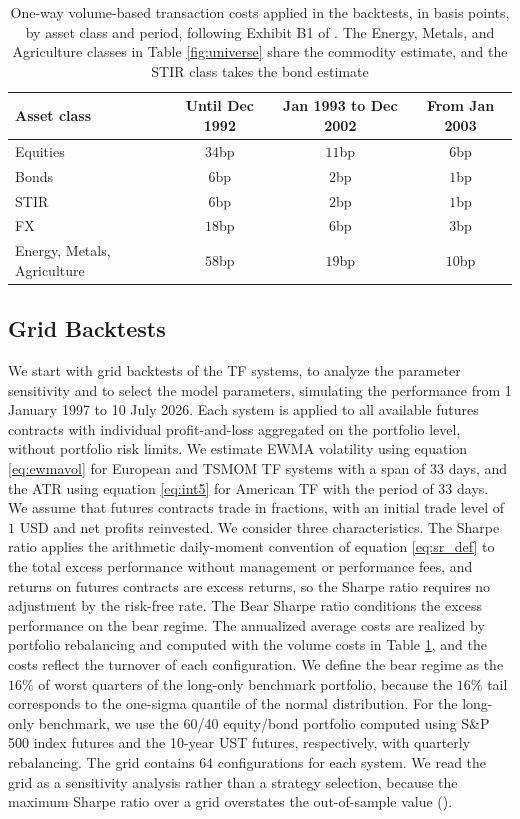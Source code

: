 \documentclass[hidelinks]{siamonline250211}
\begin{document}
\begin{table}[th]
	\small
	\centering
	\begin{tabular}{lccc}
		\hline
		Asset class & Until Dec 1992 & Jan 1993 to Dec 2002 & From Jan 2003 \\
		\hline
		Equities & $34$bp & $11$bp & $6$bp \\
		Bonds & $6$bp & $2$bp & $1$bp \\
		STIR & $6$bp & $2$bp & $1$bp \\
		FX & $18$bp & $6$bp & $3$bp \\
		Energy, Metals, Agriculture & $58$bp & $19$bp & $10$bp \\
		\hline
	\end{tabular}
	\caption{One-way volume-based transaction costs applied in the backtests, in basis points, by asset class and period, following Exhibit B1 of \citet{Hurst2017}. The Energy, Metals, and Agriculture classes in Table \ref{fig:universe} share the commodity estimate, and the STIR class takes the bond estimate}
	\label{fig:costs}
\end{table}



\subsection{Grid Backtests}\label{sc:grid}

We start with grid backtests of the TF systems, to analyze the parameter sensitivity and to select the model parameters, simulating the performance from 1 January 1997 to 10 July 2026. Each system is applied to all available futures contracts with individual profit-and-loss aggregated on the portfolio level, without portfolio risk limits. We estimate EWMA volatility using equation \eqref{eq:ewmavol} for European and TSMOM TF systems with a span of $33$ days, and the ATR using equation \eqref{eq:int5} for American TF with the period of $33$ days. We assume that futures contracts trade in fractions, with an initial trade level of $1$ USD and net profits reinvested. We consider three characteristics. The Sharpe ratio applies the arithmetic daily-moment convention of equation \eqref{eq:sr_def} to the total excess performance without management or performance fees, and returns on futures contracts are excess returns, so the Sharpe ratio requires no adjustment by the risk-free rate. The Bear Sharpe ratio conditions the excess performance on the bear regime. The annualized average costs are realized by portfolio rebalancing and computed with the volume costs in Table \ref{fig:costs}, and the costs reflect the turnover of each configuration. We define the bear regime as the $16\%$ of worst quarters of the long-only benchmark portfolio, because the $16\%$ tail corresponds to the one-sigma quantile of the normal distribution. For the long-only benchmark, we use the 60/40 equity/bond portfolio computed using S\&P 500 index futures and the 10-year UST futures, respectively, with quarterly rebalancing. The grid contains $64$ configurations for each system. We read the grid as a sensitivity analysis rather than a strategy selection, because the maximum Sharpe ratio over a grid overstates the out-of-sample value (\citealp{Sullivan1999}).
\end{document}
